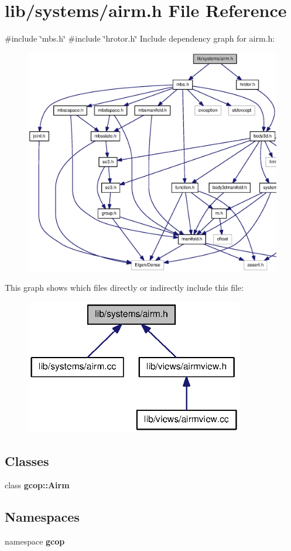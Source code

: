 \section{lib/systems/airm.h \-File \-Reference}
\label{airm_8h}
{\ttfamily \#include \char`\"{}mbs.\-h\char`\"{}}\*
{\ttfamily \#include \char`\"{}hrotor.\-h\char`\"{}}\*
\-Include dependency graph for airm.\-h\-:\nopagebreak
\begin{figure}[H]
\begin{center}
\leavevmode
\includegraphics[width=350pt]{airm_8h__incl}
\end{center}
\end{figure}
\-This graph shows which files directly or indirectly include this file\-:\nopagebreak
\begin{figure}[H]
\begin{center}
\leavevmode
\includegraphics[width=271pt]{airm_8h__dep__incl}
\end{center}
\end{figure}
\subsection*{\-Classes}
\begin{DoxyCompactItemize}
\item 
class {\bf gcop\-::\-Airm}
\end{DoxyCompactItemize}
\subsection*{\-Namespaces}
\begin{DoxyCompactItemize}
\item 
namespace {\bf gcop}
\end{DoxyCompactItemize}
